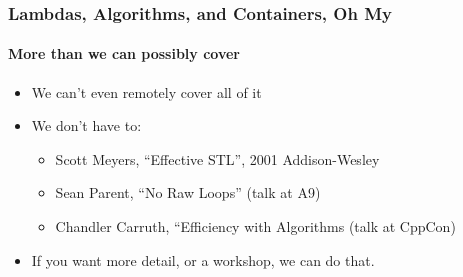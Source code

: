 \begin{frame}[fragile]
\frametitle{Lambdas, Algorithms, and Containers, Oh My}
\framesubtitle{More than we can possibly cover}

\begin{itemize}[<+->]
\item We can't even remotely cover all of it
\item We don't have to:
  \begin{itemize}
  \item Scott Meyers, ``Effective STL'', 2001 Addison-Wesley
  \item Sean Parent, ``No Raw Loops'' (talk at A9)
  \item Chandler Carruth, ``Efficiency with Algorithms (talk at CppCon)
  \end{itemize}
\item If you want more detail, or a workshop, we can do that.
\end{itemize}


\end{frame}

